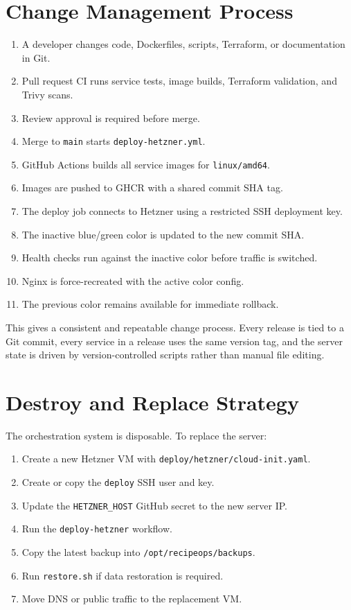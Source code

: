 \documentclass[11pt,a4paper]{article}
\begin{document}
\section{Change Management Process}

\begin{enumerate}
\item A developer changes code, Dockerfiles, scripts, Terraform, or documentation in Git.
\item Pull request CI runs service tests, image builds, Terraform validation, and Trivy scans.
\item Review approval is required before merge.
\item Merge to \texttt{main} starts \texttt{deploy-hetzner.yml}.
\item GitHub Actions builds all service images for \texttt{linux/amd64}.
\item Images are pushed to GHCR with a shared commit SHA tag.
\item The deploy job connects to Hetzner using a restricted SSH deployment key.
\item The inactive blue/green color is updated to the new commit SHA.
\item Health checks run against the inactive color before traffic is switched.
\item Nginx is force-recreated with the active color config.
\item The previous color remains available for immediate rollback.
\end{enumerate}

This gives a consistent and repeatable change process. Every release is tied to a Git commit, every service in a release uses the same version tag, and the server state is driven by version-controlled scripts rather than manual file editing.

\section{Destroy and Replace Strategy}

The orchestration system is disposable. To replace the server:

\begin{enumerate}
\item Create a new Hetzner VM with \texttt{deploy/hetzner/cloud-init.yaml}.
\item Create or copy the \texttt{deploy} SSH user and key.
\item Update the \texttt{HETZNER\_HOST} GitHub secret to the new server IP.
\item Run the \texttt{deploy-hetzner} workflow.
\item Copy the latest backup into \texttt{/opt/recipeops/backups}.
\item Run \texttt{restore.sh} if data restoration is required.
\item Move DNS or public traffic to the replacement VM.
\end{enumerate}
\end{document}
